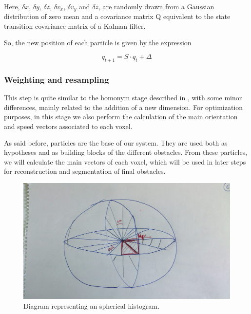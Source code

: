 Here, $\delta x$, $\delta y$, $\delta z$, $\delta v_x$, $\delta v_y$ and $\delta z$, are randomly drawn from a Gaussian distribution of zero mean and a covariance matrix Q equivalent to the state transition covariance matrix of a Kalman filter.

So, the new position of each particle is given by the expression

\begin{equation}\label{eq:cp05_particle_update}
q_{t + 1} = S \cdot q_{t} + \Delta
\end{equation}

\FloatBarrier

\subsubsection{Weighting and resampling}\label{ch:chapter05_01_04_02}

This step is quite similar to the homonym stage described in \cite{danescu2012particle}, with some minor differences, mainly related to the addition of a new dimension. For optimization purposes, in this stage we also perform the calculation of the main orientation and speed vectors associated to each voxel.

As said before, particles are the base of our system. They are used both as hypotheses and as building blocks of the different obstacles. From these particles, we will calculate the main vectors of each voxel, which will be used in later steps for reconstruction and segmentation of final obstacles.

\begin{figure}[h!]
  \centering
  \includegraphics{sphericalHist}
  \caption{Diagram representing an spherical histogram.}\label{fig:cp05_spherical_hist}
\end{figure}

